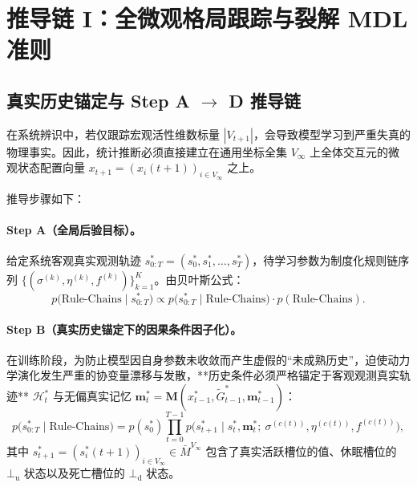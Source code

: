 \documentclass[11pt,a4paper]{article}
\numberwithin{equation}{section}
\theoremstyle{definition}
\theoremstyle{remark}
\begin{document}
	\section{\texorpdfstring{推导链 I：全微观格局跟踪与裂解 MDL 准则}{推导链 I：全微观格局跟踪与裂解 MDL 准则}}\label{sec:measure}
	
	\subsection{\texorpdfstring{真实历史锚定与 Step A $\to$ D 推导链}{真实历史锚定与 Step A -> D 推导链}}
	
	在系统辨识中，若仅跟踪宏观活性维数标量 $|V_{t+1}|$，会导致模型学习到严重失真的物理事实。因此，统计推断必须直接建立在通用坐标全集 $V_\infty$ 上全体交互元的微观状态配置向量 $x_{t+1} = (x_i(t+1))_{i\in V_\infty}$ 之上。
	
	推导步骤如下：
	\paragraph{Step A（全局后验目标）。}
	给定系统客观真实观测轨迹 $s_{0:T}^\ast = (s_0^\ast, s_1^\ast, \dots, s_T^\ast)$，待学习参数为制度化规则链序列 $\{(\sigma^{(k)}, \eta^{(k)}, f^{(k)})\}_{k=1}^K$。由贝叶斯公式：
	\begin{equation}
		p\bigl(\text{Rule-Chains}\mid s_{0:T}^\ast\bigr) \propto
		p\bigl(s_{0:T}^\ast\mid\text{Rule-Chains}\bigr) \cdot p(\text{Rule-Chains}).
		\label{eq:step-a}
	\end{equation}
	
	\paragraph{Step B（真实历史锚定下的因果条件因子化）。}
	在训练阶段，为防止模型因自身参数未收敛而产生虚假的“未成熟历史”，迫使动力学演化发生严重的协变量漂移与发散，**历史条件必须严格锚定于客观观测真实轨迹** $\mathcal{H}_t^\ast$ 与无偏真实记忆 $\mathbf{m}_t^\ast = \mathbf{M}(x_{t-1}^\ast, \widetilde{G}_{t-1}^\ast, \mathbf{m}_{t-1}^\ast)$：
	\begin{equation}
		p\bigl(s_{0:T}^\ast\mid\text{Rule-Chains}\bigr) = p(s_0^\ast)\prod_{t=0}^{T-1} p\bigl(s_{t+1}^\ast\mid s_t^\ast, \mathbf{m}_t^\ast;\ \sigma^{(c(t))}, \eta^{(c(t))}, f^{(c(t))}\bigr),
		\label{eq:step-b}
	\end{equation}
	其中 $s_{t+1}^\ast = (s_i^\ast(t+1))_{i\in V_\infty} \in \bar{M}^{V_\infty}$ 包含了真实活跃槽位的值、休眠槽位的 $\bot_{\mathrm{u}}$ 状态以及死亡槽位的 $\bot_{\mathrm{d}}$ 状态。
	
\end{document}
